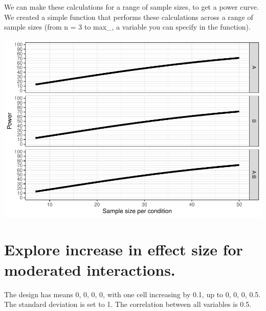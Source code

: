 \documentclass[]{book}
\newenvironment{Shaded}{\begin{snugshade}}{\end{snugshade}}
\newcommand{\DataTypeTok}[1]{\textcolor[rgb]{0.13,0.29,0.53}{#1}}
\newcommand{\DecValTok}[1]{\textcolor[rgb]{0.00,0.00,0.81}{#1}}
\newcommand{\KeywordTok}[1]{\textcolor[rgb]{0.13,0.29,0.53}{\textbf{#1}}}
\newcommand{\NormalTok}[1]{#1}
\newcommand{\OperatorTok}[1]{\textcolor[rgb]{0.81,0.36,0.00}{\textbf{#1}}}
\newcommand{\StringTok}[1]{\textcolor[rgb]{0.31,0.60,0.02}{#1}}
\begin{document}
We can make these calculations for a range of sample sizes, to get a power curve. We created a simple function that performs these calculations across a range of sample sizes (from n = 3 to max\_, a variable you can specify in the function).

\begin{Shaded}
\end{Shaded}

\includegraphics{SuperpowerValidation_files/figure-latex/unnamed-chunk-216-1.pdf}

\hypertarget{explore-increase-in-effect-size-for-moderated-interactions.}{%
\section{Explore increase in effect size for moderated interactions.}\label{explore-increase-in-effect-size-for-moderated-interactions.}}

The design has means 0, 0, 0, 0, with one cell increasing by 0.1, up to 0, 0, 0, 0.5. The standard deviation is set to 1. The correlation between all variables is 0.5.
\end{document}
